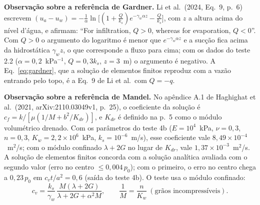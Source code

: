 \documentclass[11pt,a4paper]{article}
\numberwithin{equation}{section}
\begin{document}
\textbf{Observação sobre a referência de Gardner.} Li et al.\ (2024, Eq.~9, p.~6) escrevem
$(u_a-u_w)=-\frac1\alpha\ln\big[(1+\frac Q{k_s})e^{-\gamma_w\alpha z}-\frac Q{k_s}\big]$, com $z$ a altura acima do nível
d'água, e afirmam: ``For infiltration, $Q>0$, whereas for evaporation, $Q<0$''. Com $Q>0$ o argumento do logaritmo é
menor que $e^{-\gamma_w\alpha z}$ e a sucção fica acima da hidrostática $\gamma_wz$, o que corresponde a fluxo para cima; com
os dados do teste 2.2 ($\alpha=0{,}2$~kPa$^{-1}$, $Q=0{,}3k_s$, $z=3$~m) o argumento é negativo. A Eq.~\eqref{eq:gardner},
que a solução de elementos finitos reproduz com a vazão entrando pelo topo, é a Eq.~9 de Li et al.\ com $Q=-q$.

\textbf{Observação sobre a referência de Mandel.} No apêndice A.1 de Haghighat et al.\ (2021, arXiv:2110.03049v1, p.~25),
o coeficiente da solução é $c_f=k/[\mu(1/M+b^2/K_{dr})]$, e $K_{dr}$ é definido na p.~5 como o módulo volumétrico drenado.
Com os parâmetros do teste 4b ($E=10^4$~kPa, $\nu=0{,}3$, $n=0{,}3$, $K_w=2{,}2\times10^6$~kPa, $k_s=10^{-6}$~m/s), esse
coeficiente vale $8{,}49\times10^{-4}$~m$^2$/s; com o módulo confinado $\lambda+2G$ no lugar de $K_{dr}$, vale
$1{,}37\times10^{-3}$~m$^2$/s. A solução de elementos finitos concorda com a solução analítica avaliada com o segundo
valor (erro no centro $\le0{,}004\,p_0$); com o primeiro, o erro no centro chega a $0{,}23\,p_0$ em $c_vt/a^2=0{,}6$ (saída
do teste 4b). O teste usa o módulo confinado:
\begin{equation}
c_v=\frac{k_s}{\gamma_w}\,\frac{M(\lambda+2G)}{\lambda+2G+\alpha^2M},\qquad \frac1M=\frac{n}{K_w}\ (\text{grãos incompressíveis}).
\label{eq:cmandel}
\end{equation}

\end{document}
